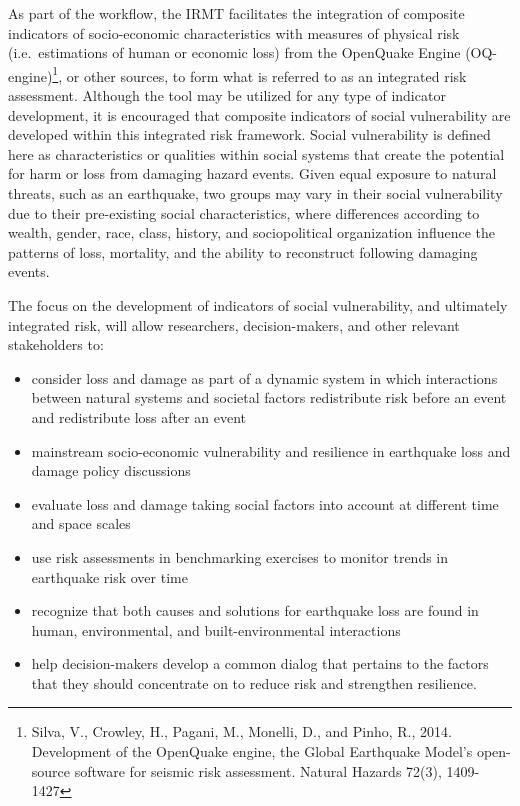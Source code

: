As part of the workflow, the IRMT facilitates the integration of composite
indicators of socio-economic characteristics with measures of physical risk
(i.e.\ estimations of human or economic loss) from the OpenQuake Engine
(OQ-engine)\footnote{Silva, V., Crowley, H., Pagani, M., Monelli, D., and
Pinho, R., 2014. Development of the OpenQuake engine, the Global Earthquake
Model's open-source software for seismic risk assessment. Natural Hazards
72(3), 1409-1427}, or other sources, to form what is referred to as an
integrated risk assessment. Although the tool may be utilized for any type of
indicator development, it is encouraged that composite indicators of social
vulnerability are developed within this integrated risk framework. Social
vulnerability is defined here as characteristics or qualities within social
systems that create the potential for harm or loss from damaging hazard events.
Given equal exposure to natural threats, such as an earthquake, two groups may
vary in their social vulnerability due to their pre-existing social
characteristics, where differences according to wealth, gender, race, class,
history, and sociopolitical organization influence the patterns of loss,
mortality, and the ability to reconstruct following damaging events.

The focus on the development of indicators of social vulnerability, and
ultimately integrated risk, will allow researchers, decision-makers, and other
relevant stakeholders to:

\begin{itemize}
    \item consider loss and damage as part of a dynamic system in which
        interactions between natural systems and societal factors redistribute
        risk before an event and redistribute loss after an event
    \item mainstream socio-economic vulnerability and resilience in earthquake
        loss and damage policy discussions
    \item evaluate loss and damage taking social factors into account at
        different time and space scales
    \item use risk assessments in benchmarking exercises to monitor trends in
        earthquake risk over time
    \item recognize that both causes and solutions for earthquake loss are
        found in human, environmental, and built-environmental interactions
    \item help decision-makers develop a common dialog that pertains to the
        factors that they should concentrate on to reduce risk and strengthen
        resilience.
\end{itemize}

